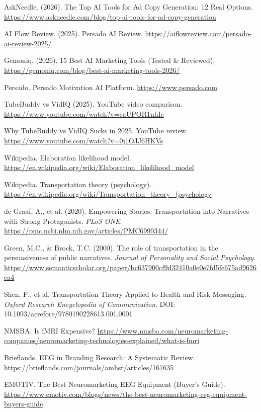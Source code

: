 \documentclass[11pt,letterpaper]{article}
\begin{document}
\begin{list}{}{\setlength{\leftmargin}{2em}\setlength{\itemindent}{-2em}\setlength{\itemsep}{2pt}}
\item[{[49]}] AskNeedle. (2026). The Top AI Tools for Ad Copy Generation: 12 Real Options. \url{https://www.askneedle.com/blog/top-ai-tools-for-ad-copy-generation}
\item[{[50]}] AI Flow Review. (2025). Persado AI Review. \url{https://aiflowreview.com/persado-ai-review-2025/}
\item[{[51]}] Gemoniq. (2026). 15 Best AI Marketing Tools (Tested \& Reviewed). \url{https://gemoniq.com/blog/best-ai-marketing-tools-2026/}
\item[{[52]}] Persado. Persado Motivation AI Platform. \url{https://www.persado.com}
\item[{[53]}] TubeBuddy vs VidIQ (2025). YouTube video comparison. \url{https://www.youtube.com/watch?v=caUPOR1nhIc}
\item[{[54]}] Why TubeBuddy vs VidIQ Sucks in 2025. YouTube review. \url{https://www.youtube.com/watch?v=0j1OJJ6HKVs}
\item[{[55]}] Wikipedia. Elaboration likelihood model. \url{https://en.wikipedia.org/wiki/Elaboration_likelihood_model}
\item[{[56]}] Wikipedia. Transportation theory (psychology). \url{https://en.wikipedia.org/wiki/Transportation_theory_(psychology}
\item[{[57]}] de Graaf, A., et al. (2020). Empowering Stories: Transportation into Narratives with Strong Protagonists. \textit{PLoS ONE}. \url{https://pmc.ncbi.nlm.nih.gov/articles/PMC6999344/}
\item[{[58]}] Green, M.C., \& Brock, T.C. (2000). The role of transportation in the persuasiveness of public narratives. \textit{Journal of Personality and Social Psychology}. \url{https://www.semanticscholar.org/paper/bc637900cf9d32410a0e0e7fd5fe675ad9626ea4}
\item[{[59]}] Shen, F., et al. Transportation Theory Applied to Health and Risk Messaging. \textit{Oxford Research Encyclopedia of Communication}. DOI: 10.1093/acrefore/9780190228613.001.0001
\item[{[60]}] NMSBA. Is fMRI Expensive? \url{https://www.nmsba.com/neuromarketing-companies/neuromarketing-technologies-explained/what-is-fmri}
\item[{[61]}] Brieflands. EEG in Branding Research: A Systematic Review. \url{https://brieflands.com/journals/amhsr/articles/167635}
\item[{[62]}] EMOTIV. The Best Neuromarketing EEG Equipment (Buyer's Guide). \url{https://www.emotiv.com/blogs/news/the-best-neuromarketing-eeg-equipment-buyers-guide}

\end{list}
\end{document}
